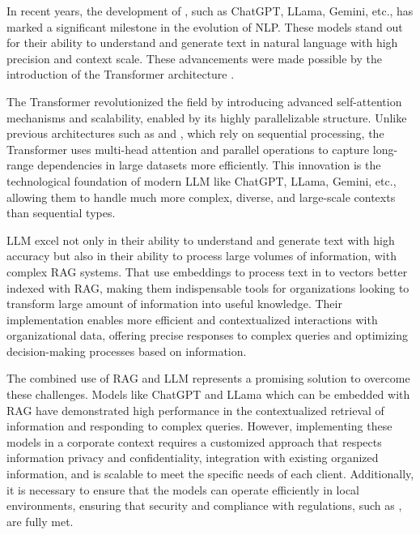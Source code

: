 In recent years, the development of , such as ChatGPT, LLama, Gemini, etc., has marked a significant milestone in the evolution of \gls{NLP}. These models stand out for their ability to understand and generate text in natural language with high precision and context scale. These advancements were made possible by the introduction of the Transformer architecture \cite{vaswani2017attention}.

The Transformer revolutionized the field by introducing advanced self-attention mechanisms and scalability, enabled by its highly parallelizable structure. Unlike previous architectures such as  and , which rely on sequential processing, the Transformer uses multi-head attention and parallel operations to capture long-range dependencies in large datasets more efficiently. This innovation is the technological foundation of modern \gls{LLM} like ChatGPT, LLama, Gemini, etc., allowing them to handle much more complex, diverse, and large-scale contexts than sequential types.

\gls{LLM} excel not only in their ability to understand and generate text with high accuracy but also in their ability to process large volumes of information, with complex \gls{RAG} systems. That use embeddings to process text in to vectors better indexed with \gls{RAG}, making them indispensable tools for organizations looking to transform large amount of information into useful knowledge. Their implementation enables more efficient and contextualized interactions with organizational data, offering precise responses to complex queries and optimizing decision-making processes based on information.

The combined use of \gls{RAG} and \gls{LLM} represents a promising solution to overcome these challenges. Models like ChatGPT and LLama which can be embedded with \gls{RAG} have demonstrated high performance in the contextualized retrieval of information and responding to complex queries. However, implementing these models in a corporate context requires a customized approach that respects information privacy and confidentiality, integration with existing organized information, and is scalable to meet the specific needs of each client. Additionally, it is necessary to ensure that the models can operate efficiently in local environments, ensuring that security and compliance with regulations, such as , are fully met.

